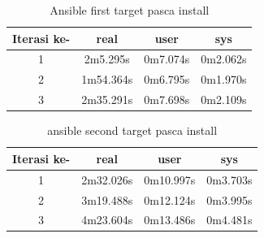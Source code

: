 \documentclass[10pt,]{report}
\begin{document}
\begin{adjustwidth}{20pt}{}
\begin{adjustwidth}{20pt}{}
		\begin{table}[H]
			\caption{Ansible first target pasca install}
			\begin{center}
				\begin{tabular}[c]{|c|c|c|c|}
					\hline
					\multicolumn{1}{|c|}{\textbf{Iterasi ke-}} &
					\multicolumn{1}{c|}{\textbf{real}}         &
					\multicolumn{1}{c|}{\textbf{user}}         &
					\multicolumn{1}{c|}{\textbf{sys}}                                            \\
					\hline
					1                                          & 2m5.295s  & 0m7.074s & 0m2.062s \\
					\hline
					2                                          & 1m54.364s & 0m6.795s & 0m1.970s \\
					\hline
					3                                          & 2m35.291s & 0m7.698s & 0m2.109s \\
					\hline
				\end{tabular}
			\end{center}
		\end{table}
		\vspace{-5mm}

		\begin{table}[H]
			\caption{ansible second target pasca install}
			\begin{center}
				\begin{tabular}[c]{|c|c|c|c|}
					\hline
					\multicolumn{1}{|c|}{\textbf{Iterasi ke-}} &
					\multicolumn{1}{c|}{\textbf{real}}         &
					\multicolumn{1}{c|}{\textbf{user}}         &
					\multicolumn{1}{c|}{\textbf{sys}}                                             \\
					\hline
					1                                          & 2m32.026s & 0m10.997s & 0m3.703s \\
					\hline
					2                                          & 3m19.488s & 0m12.124s & 0m3.995s \\
					\hline
					3                                          & 4m23.604s & 0m13.486s & 0m4.481s \\
					\hline
				\end{tabular}
			\end{center}
		\end{table}
	\end{adjustwidth}

\end{adjustwidth}
\end{document}
